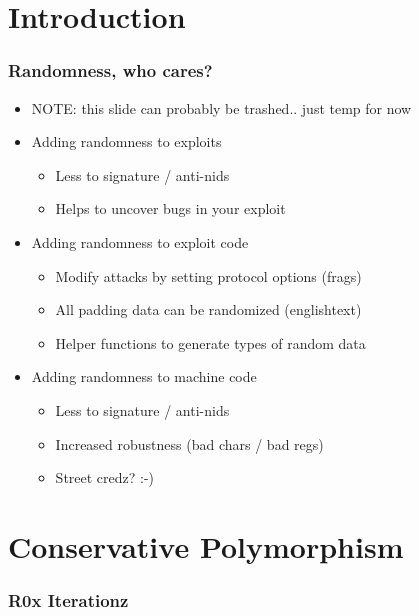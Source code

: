 \documentclass{beamer}
\newenvironment{sitemize}{\vspace{1mm}\begin{itemize}\itemsep 4pt}{\end{itemize}}
\begin{document}
\section{Introduction}
\begin{frame}
  \frametitle{Randomness, who cares?}
  \begin{sitemize}
    \item NOTE: this slide can probably be trashed.. just temp for now
    \item Adding randomness to exploits
    \begin{sitemize}
      \item Less to signature / anti-nids
      \item Helps to uncover bugs in your exploit
    \end{sitemize}
    \pause
    
	\item Adding randomness to exploit code
    \begin{sitemize}
      \item Modify attacks by setting protocol options (frags)
      \item All padding data can be randomized (englishtext)
      \item Helper functions to generate types of random data
    \end{sitemize}
		
    \item Adding randomness to machine code
    \begin{sitemize}
      \item Less to signature / anti-nids
      \item Increased robustness (bad chars / bad regs)
      \item Street credz? :-)
    \end{sitemize}
	
  \end{sitemize}
\end{frame}

\section{Conservative Polymorphism}

\newcommand{\incshi}[1]{\texttt{[image: \#1]}}

\begin{frame}
  \frametitle{R0x Iterationz}
  \only<9>{\incshi{shi8}}
  \only<8>{\incshi{shi7}}
  \only<7>{\incshi{shi6}}
  \only<6>{\incshi{shi5}}
  \only<5>{\incshi{shi4}}
  \only<4>{\incshi{shi3}}
  \only<3>{\incshi{shi2}}
  \only<2>{\incshi{shi1}}
  \only<1>{\incshi{shi0}}
\end{frame}
\end{document}
